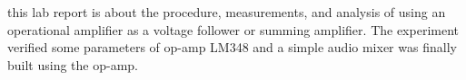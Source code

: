 this lab report is about the procedure, measurements, and analysis of using an operational amplifier as a voltage follower or summing amplifier. The experiment verified some parameters of op-amp LM348 and a simple audio mixer was finally built using the op-amp.